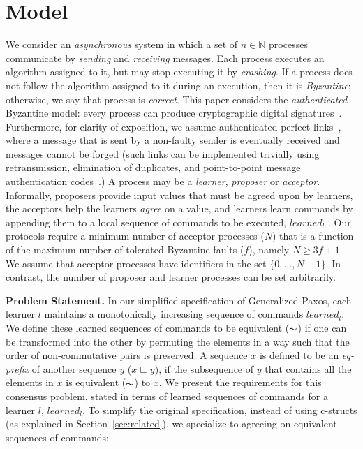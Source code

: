 \section{Model}
\label{sec:model}
%
We consider an \emph{asynchronous} system in which
a set of $n \in \mathbb{N}$ processes communicate by 
\emph{sending} and \emph{receiving} messages.
Each process executes an algorithm assigned to it, but may stop executing it by \emph{crashing}.
If a process does not follow the algorithm assigned to it during an execution, then it is \emph{Byzantine}; otherwise, we say that process is \emph{correct}.
This paper considers the \emph{authenticated} Byzantine model: every process can produce cryptographic digital signatures~\cite{quorum}. 
Furthermore, for clarity of exposition, we assume authenticated perfect links~\cite{cgr:book}, 
where a message that is sent by a non-faulty sender is eventually received and messages cannot be forged 
(such links can be implemented trivially using retransmission, elimination of duplicates, and point-to-point message authentication codes~\cite{cgr:book}.)
A process may be a \emph{learner}, \emph{proposer} or \emph{acceptor}.
Informally, proposers provide input values that must be agreed upon by learners, the acceptors help the learners \emph{agree} on a value, and learners learn commands by appending them to a local sequence of commands to be executed, $learned_l$ .
Our protocols require a minimum number of acceptor processes ($N$) that is a function of the maximum number of tolerated Byzantine faults ($f$), namely $N \ge 3f+1$. We assume that acceptor processes have identifiers in the set $\{0,...,N-1\}$. In contrast, the number of proposer and learner processes can be set arbitrarily.\par
\noindent\textbf{Problem Statement.}
In our simplified specification of Generalized Paxos, each learner $l$ maintains a monotonically increasing sequence of commands $learned_l$. 
We define these learned sequences of commands to be equivalent ($\thicksim$) 
if one can be transformed into the other by permuting the elements in a way such that the order of non-commutative pairs is preserved. A sequence $x$ is defined to be an \textit{eq-prefix} of another sequence $y$ ($x \sqsubseteq y$), if the subsequence of $y$ that contains all the elements in $x$ is equivalent ($\thicksim$) to $x$. 
We present the requirements for this consensus problem, stated in terms of learned sequences of commands for a learner $l$, $learned_l$. 
To simplify the original specification, instead of using c-structs (as explained in Section~\ref{sec:related}), we specialize to agreeing on equivalent sequences of commands:\par
